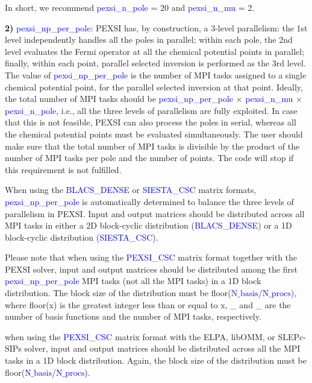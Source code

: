 \documentclass{report}
\begin{document}
In short, we recommend \textcolor{blue}{pexsi\_n\_pole} = 20 and \textcolor{blue}{pexsi\_n\_mu} = 2.

\textbf{2)} \textcolor{blue}{pexsi\_np\_per\_pole}:  PEXSI has, by construction, a 3-level parallelism:  the 1st level independently handles all the poles in parallel; within each pole, the 2nd level evaluates the Fermi operator at all the chemical potential points in parallel; finally, within each point, parallel selected inversion is performed as the 3rd level.  The value of \textcolor{blue}{pexsi\_np\_per\_pole} is the number of MPI tasks assigned to a single chemical potential point, for the parallel selected inversion at that point.  Ideally, the total number of MPI tasks should be \textcolor{blue}{pexsi\_np\_per\_pole} $\times$ \textcolor{blue}{pexsi\_n\_mu} $\times$ \textcolor{blue}{pexsi\_n\_pole}, i.e., all the three levels of parallelism are fully exploited.  In case that this is not feasible, PEXSI can also process the poles in serial, whereas all the chemical potential points must be evaluated simultaneously.  The user should make sure that the total number of MPI tasks is divisible by the product of the number of MPI tasks per pole and the number of points.  The code will stop if this requirement is not fulfilled.

When using the \textcolor{blue}{BLACS\_DENSE} or \textcolor{blue}{SIESTA\_CSC} matrix formats, \textcolor{blue}{pexsi\_np\_per\_pole} is automatically determined to balance the three levels of parallelism in PEXSI.  Input and output matrices should be distributed across all MPI tasks in either a 2D block-cyclic distribution (\textcolor{blue}{BLACS\_DENSE}) or a 1D block-cyclic distribution (\textcolor{blue}{SIESTA\_CSC}).

Please note that when using the \textcolor{blue}{PEXSI\_CSC} matrix format together with the PEXSI solver, input and output matrices should be distributed among the first \textcolor{blue}{pexsi\_np\_per\_pole} MPI tasks (not all the MPI tasks) in a 1D block distribution.  The block size of the distribution must be floor(\textcolor{blue}{$\text{N}\_\text{basis}$}/\textcolor{blue}{$\text{N}\_\text{procs}$}), where floor(x) is the greatest integer less than or equal to x, \textcolor{blue}{\_} and \textcolor{blue}{\_} are the number of basis functions and the number of MPI tasks, respectively.

when using the \textcolor{blue}{PEXSI\_CSC} matrix format with the ELPA, libOMM, or SLEPc-SIPs solver, input and output matrices should be distributed across all the MPI tasks in a 1D block distribution.  Again, the block size of the distribution must be floor(\textcolor{blue}{$\text{N}\_\text{basis}$}/\textcolor{blue}{$\text{N}\_\text{procs}$}).
\end{document}
